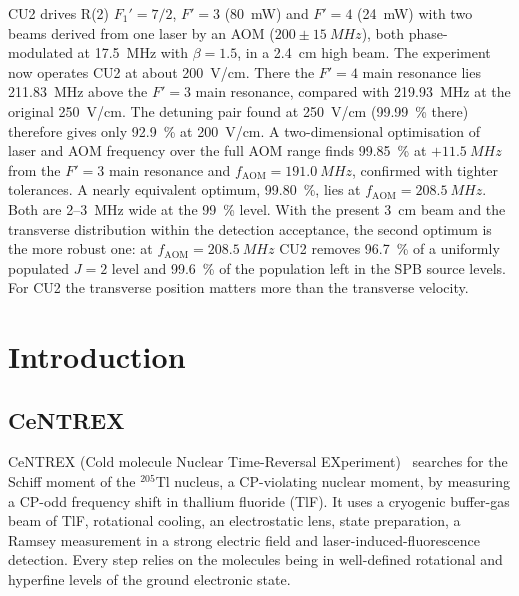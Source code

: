 \documentclass[11pt,a4paper,oneside]{report}
\begin{document}
CU2 drives R(2) $F_1'=7/2$, $F'=3$ (\SI{80}{mW}) and $F'=4$ (\SI{24}{mW}) with two beams
derived from one laser by an AOM ($200\pm\SI{15}{MHz}$), both phase-modulated at
\SI{17.5}{MHz} with $\beta=1.5$, in a \SI{2.4}{cm} high beam. The experiment now operates
CU2 at about \SI{200}{V/cm}. There the $F'=4$ main resonance lies \SI{211.83}{MHz} above the
$F'=3$ main resonance, compared with \SI{219.93}{MHz} at the original \SI{250}{V/cm}. The
detuning pair found at \SI{250}{V/cm} (\SI{99.99}{\percent} there) therefore gives only
\SI{92.9}{\percent} at \SI{200}{V/cm}. A two-dimensional optimisation of laser and AOM
frequency over the full AOM range finds \SI{99.85}{\percent} at $+\SI{11.5}{MHz}$ from the
$F'=3$ main resonance and $f_{\mathrm{AOM}}=\SI{191.0}{MHz}$, confirmed with tighter
tolerances. A nearly equivalent optimum, \SI{99.80}{\percent}, lies at
$f_{\mathrm{AOM}}=\SI{208.5}{MHz}$. Both are 2--\SI{3}{MHz} wide at the \SI{99}{\percent} level.
With the present \SI{3}{cm} beam and the transverse distribution within the detection
acceptance, the second optimum is the more robust one: at $f_{\mathrm{AOM}}=\SI{208.5}{MHz}$
CU2 removes \SI{96.7}{\percent} of a uniformly populated $J=2$ level and \SI{99.6}{\percent}
of the population left in the SPB source levels. For CU2 the transverse position matters more
than the transverse velocity.

\tableofcontents
\listoffigures
\listoftables

\cleardoublepage
{}

\chapter{Introduction}
\label{ch:intro}

\section{CeNTREX}

CeNTREX (Cold molecule Nuclear Time-Reversal EXperiment)~\cite{Grasdijk2021} searches for
the Schiff moment of the $^{205}$Tl nucleus, a CP-violating nuclear moment, by measuring a
CP-odd frequency shift in thallium fluoride (TlF). It uses a cryogenic buffer-gas beam of
TlF, rotational cooling, an electrostatic lens, state preparation, a Ramsey measurement in a
strong electric field and laser-induced-fluorescence detection. Every step relies on the
molecules being in well-defined rotational and hyperfine levels of the ground electronic
state.
\end{document}
